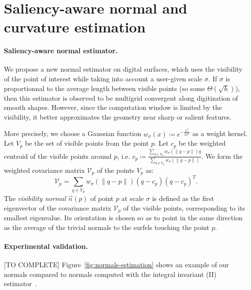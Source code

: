 \documentclass[runningheads]{llncs}
\begin{document}


    \section{Saliency-aware normal and curvature estimation}

    \newcommand{\Kernel}[1]{\ensuremath{w_{\sigma}(#1)}}

    \paragraph{Saliency-aware normal estimator.}
    We propose a new normal estimator on digital surfaces, which uses
    the visibility of the point of interest while taking into account
    a user-given scale $\sigma$. If $\sigma$ is proportionnal to the
    average length between visible points (so some
    $\Theta\left(\sqrt{h}\right)$), then this estimator is observed to be
    multigrid convergent along digitization of smooth shapes. However,
    since the computation window is limited by the visibility, it
    better approximates the geometry near sharp or salient features.

    More precisely, we choose a Gaussian function
    $\Kernel{x}\coloneqq e^{-\frac{x^2}{2\sigma^2}}$ as a weight kernel. Let
    $V_p$ be the set of visible points from the point $p$. Let $c_p$
    be the weighted centroid of the visible points around $p$,
    i.e. $c_p \coloneqq \frac{\sum_{q \in V_p} \Kernel{\|q-p\|}q}{\sum_{q \in
    V_p} \Kernel{\|q-p\|}}$. We form the weighted covariance matrix
    $\mathcal{V}_p$ of the points $V_p$ as:
    \begin{equation}
        \mathcal{V}_p = \sum_{q \in V_p} \Kernel{\|q-p\|}(q - c_p)(q - c_p)^T.
    \end{equation}
    The \emph{visibility normal} $\vec{n}(p)$ of point $p$ at scale $\sigma$ is defined
    as the first eigenvector of the covariance matrix $\mathcal{V}_p$
    of the visible points, corresponding to its smallest
    eigenvalue. Its orientation is chosen so as to point in the same
    direction as the average of the trivial normals to the surfels
    touching the point $p$.


    \paragraph{Experimental validation.} [TO COMPLETE]
    Figure~\ref{fig:normals-estimation} shows an example
    of our normals compared to normals computed with the integral invariant (II) estimator~\cite{Lachaud:2017-lnm}.
\end{document}
